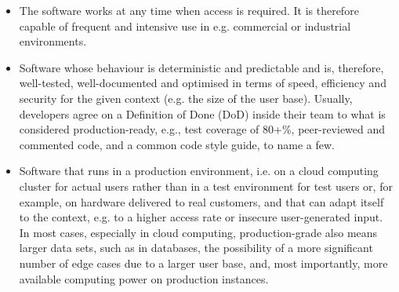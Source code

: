 \begin{itemize}
  \item The software works at any time when access is required. It is therefore capable of frequent and intensive use in e.g. commercial or industrial environments.
  \item Software whose behaviour is deterministic and predictable and is, therefore, well-tested, well-documented and optimised in terms of speed, efficiency and security for the given context (e.g. the size of the user base). Usually, developers agree on a Definition of Done (DoD) inside their team to what is considered production-ready, e.g., test coverage of 80+\%, peer-reviewed and commented code, and a common code style guide, to name a few.
  \item Software that runs in a production environment, i.e. on a cloud computing cluster for actual users rather than in a test environment for test users or, for example, on hardware delivered to real customers, and that can adapt itself to the context, e.g. to a higher access rate or insecure user-generated input. In most cases, especially in cloud computing, production-grade also means larger data sets, such as in databases, the possibility of a more significant number of edge cases due to a larger user base, and, most importantly, more available computing power on production instances.
\end{itemize}


